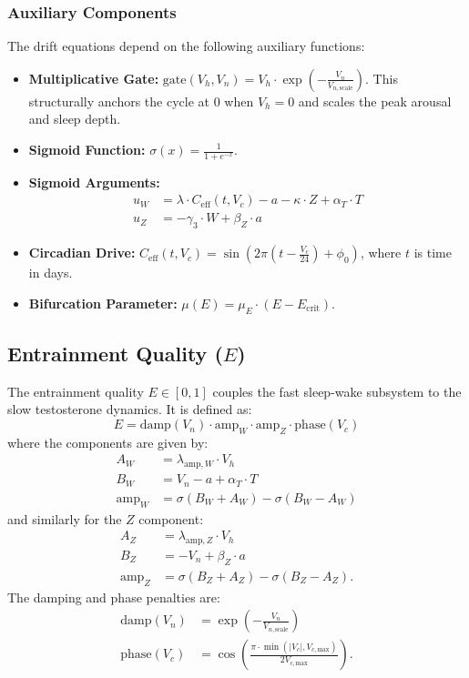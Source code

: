 \documentclass[11pt,a4paper]{article}
\begin{document}
\subsubsection*{Auxiliary Components}
The drift equations depend on the following auxiliary functions:
\begin{itemize}
    \item \textbf{Multiplicative Gate:} $\text{gate}(V_h, V_n) = V_h \cdot \exp\left(-\frac{V_n}{V_{n,\text{scale}}}\right)$. This structurally anchors the cycle at 0 when $V_h=0$ and scales the peak arousal and sleep depth.
    \item \textbf{Sigmoid Function:} $\sigma(x) = \frac{1}{1 + e^{-x}}$.
    \item \textbf{Sigmoid Arguments:}
    \begin{align*}
        u_W &= \lambda \cdot C_{\text{eff}}(t, V_c) - a - \kappa \cdot Z + \alpha_T \cdot T \\
        u_Z &= -\gamma_3 \cdot W + \beta_Z \cdot a
    \end{align*}
    \item \textbf{Circadian Drive:} $C_{\text{eff}}(t, V_c) = \sin\left(2\pi \left(t - \frac{V_c}{24}\right) + \phi_0\right)$, where $t$ is time in days.
    \item \textbf{Bifurcation Parameter:} $\mu(E) = \mu_E \cdot (E - E_{\text{crit}})$.
\end{itemize}

\subsection{Entrainment Quality ($E$)}

The entrainment quality $E \in [0, 1]$ couples the fast sleep-wake subsystem to the slow testosterone dynamics. It is defined as:
\[
E = \text{damp}(V_n) \cdot \text{amp}_W \cdot \text{amp}_Z \cdot \text{phase}(V_c)
\]
where the components are given by:
\begin{align*}
A_W &= \lambda_{\text{amp},W} \cdot V_h \\
B_W &= V_n - a + \alpha_T \cdot T \\
\text{amp}_W &= \sigma(B_W + A_W) - \sigma(B_W - A_W)
\end{align*}
and similarly for the $Z$ component:
\begin{align*}
A_Z &= \lambda_{\text{amp},Z} \cdot V_h \\
B_Z &= -V_n + \beta_Z \cdot a \\
\text{amp}_Z &= \sigma(B_Z + A_Z) - \sigma(B_Z - A_Z).
\end{align*}
The damping and phase penalties are:
\begin{align*}
\text{damp}(V_n) &= \exp\left(-\frac{V_n}{V_{n,\text{scale}}}\right) \\
\text{phase}(V_c) &= \cos\left(\frac{\pi \cdot \min(|V_c|, V_{c,\text{max}})}{2 V_{c,\text{max}}}\right).
\end{align*}
\end{document}
